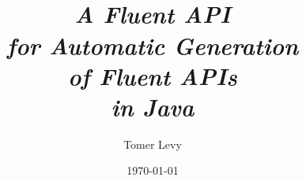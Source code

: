 \title{%
  \Huge \Fajita \\
  \Large\itshape A Fluent API \\
  \Large\itshape for Automatic Generation\\
  \Large\itshape of Fluent APIs \\
  \Large\itshape in Java}
\author{Tomer Levy}
\date{\today}

